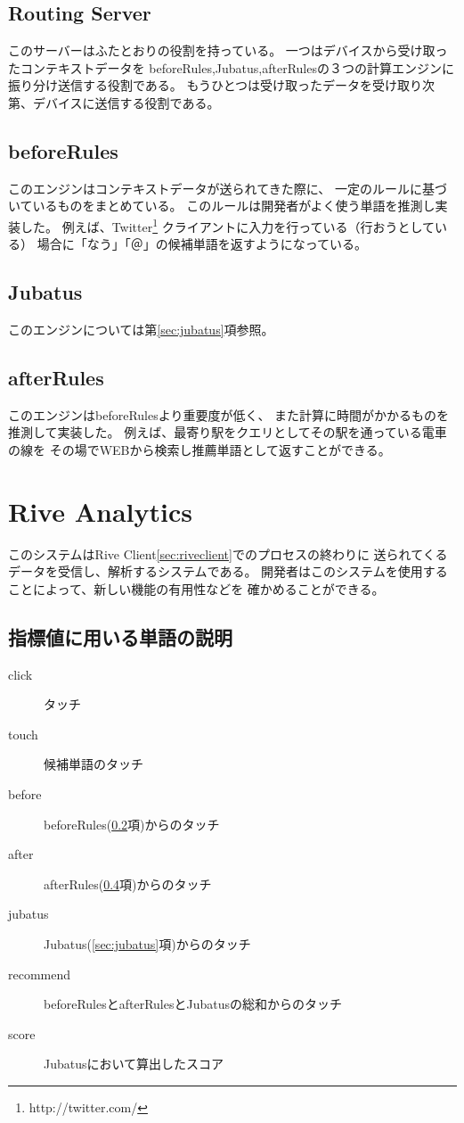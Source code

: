 \subsection{Routing Server}
このサーバーはふたとおりの役割を持っている。
一つはデバイスから受け取ったコンテキストデータを
beforeRules,Jubatus,afterRulesの３つの計算エンジンに振り分け送信する役割である。
もうひとつは受け取ったデータを受け取り次第、デバイスに送信する役割である。

\subsection{beforeRules}
\label{sec:beforerules}
このエンジンはコンテキストデータが送られてきた際に、
一定のルールに基づいているものをまとめている。
このルールは開発者がよく使う単語を推測し実装した。
例えば、Twitter\footnote{http://twitter.com/}
クライアントに入力を行っている（行おうとしている）
場合に「なう」「＠」の候補単語を返すようになっている。

\subsection{Jubatus}
このエンジンについては第\ref{sec:jubatus}項参照。

\subsection{afterRules}
\label{sec:afterrules}
このエンジンはbeforeRulesより重要度が低く、
また計算に時間がかかるものを推測して実装した。
例えば、最寄り駅をクエリとしてその駅を通っている電車の線を
その場でWEBから検索し推薦単語として返すことができる。

\section{Rive Analytics}
このシステムはRive Client\ref{sec:riveclient}でのプロセスの終わりに
送られてくるデータを受信し、解析するシステムである。
開発者はこのシステムを使用することによって、新しい機能の有用性などを
確かめることができる。

\subsection{指標値に用いる単語の説明}
\begin{description}
  \item[click] タッチ
  \item[touch] 候補単語のタッチ
  \item[before] beforeRules(\ref{sec:beforerules}項)からのタッチ
  \item[after] afterRules(\ref{sec:afterrules}項)からのタッチ
  \item[jubatus] Jubatus(\ref{sec:jubatus}項)からのタッチ
  \item[recommend] beforeRulesとafterRulesとJubatusの総和からのタッチ
  \item[score] Jubatusにおいて算出したスコア
\end{description}
